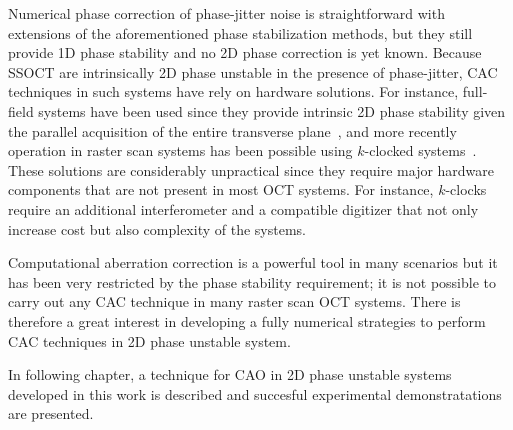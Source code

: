 Numerical phase correction of phase-jitter noise is straightforward with extensions of the aforementioned phase stabilization methods, but they still provide 1D phase stability and no 2D phase correction is yet known. Because SSOCT are intrinsically 2D phase unstable in the presence of phase-jitter, CAC techniques in such systems have rely on hardware solutions. For instance, full-field systems have been used since they provide intrinsic 2D phase stability given the parallel acquisition of the entire transverse plane~\cite{Kumar2013_Subaperture, Hillmann2016_Aberrationfree}, and more recently operation in raster scan systems has been possible using $k$-clocked systems~\cite{Kumar2017_Invivo}. These solutions are considerably unpractical since they require major hardware components that are not present in most OCT systems. For instance, $k$-clocks require an additional interferometer and a compatible digitizer that not only increase cost but also complexity of the systems. 

Computational aberration correction is a powerful tool in many scenarios but it has been very restricted by the phase stability requirement; it is not possible to carry out any CAC technique in many raster scan OCT systems. There is therefore a great interest in developing a fully numerical strategies to perform CAC techniques in 2D phase unstable system.

In following chapter, a technique for CAO in 2D phase unstable systems developed in this work is described and succesful experimental demonstratations are presented.